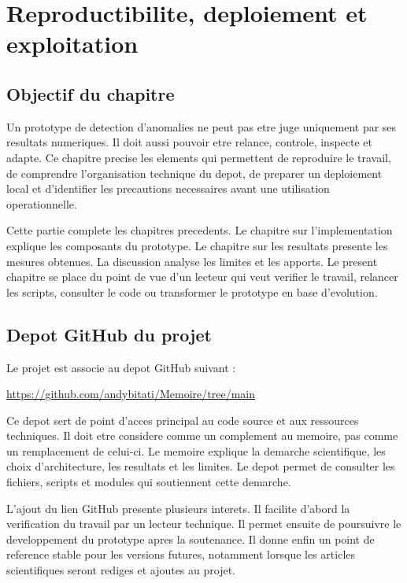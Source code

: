 \chapter{Reproductibilite, deploiement et exploitation}

\section{Objectif du chapitre}
Un prototype de detection d'anomalies ne peut pas etre juge uniquement par ses resultats numeriques. Il doit aussi pouvoir etre relance, controle, inspecte et adapte. Ce chapitre precise les elements qui permettent de reproduire le travail, de comprendre l'organisation technique du depot, de preparer un deploiement local et d'identifier les precautions necessaires avant une utilisation operationnelle.

Cette partie complete les chapitres precedents. Le chapitre sur l'implementation explique les composants du prototype. Le chapitre sur les resultats presente les mesures obtenues. La discussion analyse les limites et les apports. Le present chapitre se place du point de vue d'un lecteur qui veut verifier le travail, relancer les scripts, consulter le code ou transformer le prototype en base d'evolution.

\section{Depot GitHub du projet}
Le projet est associe au depot GitHub suivant :

\begin{center}
\url{https://github.com/andybitati/Memoire/tree/main}
\end{center}

Ce depot sert de point d'acces principal au code source et aux ressources techniques. Il doit etre considere comme un complement au memoire, pas comme un remplacement de celui-ci. Le memoire explique la demarche scientifique, les choix d'architecture, les resultats et les limites. Le depot permet de consulter les fichiers, scripts et modules qui soutiennent cette demarche.

L'ajout du lien GitHub presente plusieurs interets. Il facilite d'abord la verification du travail par un lecteur technique. Il permet ensuite de poursuivre le developpement du prototype apres la soutenance. Il donne enfin un point de reference stable pour les versions futures, notamment lorsque les articles scientifiques seront rediges et ajoutes au projet.

